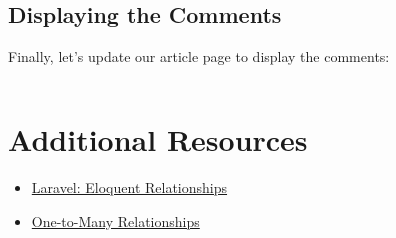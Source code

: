 \subsection{Displaying the Comments}

Finally, let's update our article page to display the comments:

\inputminted{html}{10-one-to-many/figures/comments-list.blade.php}

\section{Additional Resources}

\begin{itemize}[leftmargin=*]
    \item \href{http://laravel.com/docs/7.x/eloquent-relationships}{Laravel: Eloquent Relationships}
    \item \href{https://mysql.programmingpedia.net/en/tutorial/9600/one-to-many}{One-to-Many Relationships}
\end{itemize}
